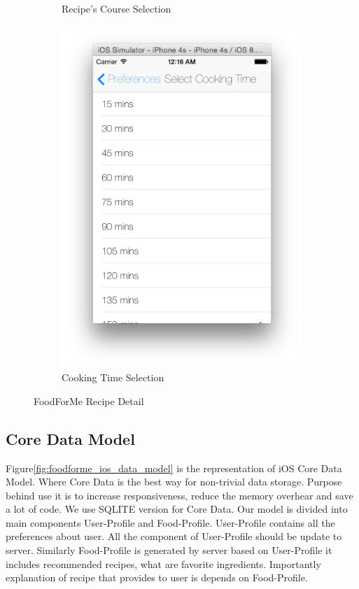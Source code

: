 \begin{figure}[h]
\begin{subfigure}{.32\textwidth}
	  		\caption{Recipe's Course Selection}
	  	\end{subfigure}
	  	\begin{subfigure}{.32\textwidth}
	  		\includegraphics[width=.75\linewidth]{figures/ch4_app_screen_shots/preferences/peferences_cooking_time.png}
	  		\caption{Cooking Time Selection}
	  	\end{subfigure}
	  	\caption{FoodForMe Recipe Detail}
	  	\label{fig:foodforme_preferences}
	  \end{figure}
	  
\subsection{Core Data Model}	  

Figure\ref{fig:foodforme_ios_data_model} is the representation of iOS Core Data Model. Where Core Data is the best way for non-trivial data storage. Purpose behind use it is to increase responsiveness, reduce the memory overhear and save a lot of code. We use SQLITE version for Core Data. Our model is divided into main components User-Profile and Food-Profile. User-Profile contains all the preferences about user. All the component of User-Profile should be update to server.  Similarly Food-Profile is generated by server based on User-Profile it includes recommended recipes, what are favorite ingredients. Importantly explanation of recipe that provides to user is depends on Food-Profile. \newline 

